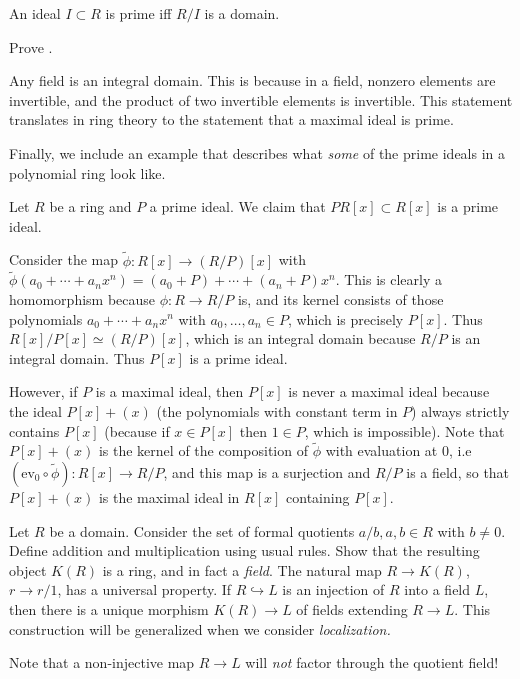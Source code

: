 \begin{proposition} \label{primeifdomain} 
An ideal $I \subset R$ is prime iff $R/I$ is a domain.
\end{proposition} 

\begin{exercise} 
Prove .
\end{exercise} 

Any field is an integral domain. This is because in a field, nonzero elements
are invertible, and the product of two invertible elements is invertible. This
statement translates in ring theory to the statement that a maximal ideal is
prime.


Finally, we include an example that describes what \emph{some} of the prime
ideals in a polynomial ring look like.
\begin{example} 
Let $R$ be a ring and $P$ a prime ideal. We claim that $PR[x] \subset R[x]$ is a
prime ideal.

Consider the map $\tilde{\phi}:R[x]\rightarrow(R/P)[x]$ with
$\tilde{\phi}(a_0+\cdots+a_nx^n)=(a_0+P)+\cdots+(a_n+P)x^n$. This is clearly
a homomorphism because $\phi:R\rightarrow R/P$ is, and its kernel consists
of those polynomials $a_0+\cdots+a_nx^n$ with $a_0,\ldots,a_n\in P$, which is
precisely $P[x]$. Thus $R[x]/P[x]\simeq (R/P)[x]$, which is an integral domain
because $R/P$ is an integral domain. Thus $P[x]$ is a prime ideal. 

However, if
$P$ is a maximal ideal, then $P[x]$ is never a maximal ideal because the ideal
$P[x]+(x)$ (the polynomials with constant term in $P$) always strictly contains
$P[x]$ (because if $x\in P[x]$ then $1\in P$, which is impossible). Note
that $P[x]+(x)$ is the kernel of the composition of $\tilde{\phi}$ with
evaluation at 0, i.e $(\text{ev}_0\circ\tilde{\phi}):R[x]\rightarrow R/P$,
and this map is a surjection and $R/P$ is a field, so that $P[x]+(x)$ is
the maximal ideal in $R[x]$ containing $P[x]$.
\end{example} 


\begin{exercise} 
Let $R$ be a domain. Consider the set of formal quotients $a/b, a, b \in R$
with $b \neq 0$. Define addition and multiplication using usual rules. Show
that the resulting object $K(R)$ is a ring, and in fact a \emph{field}. The
natural map $R \to K(R)$, $r \to r/1$, has a universal property. If $R
\hookrightarrow L$ is an injection of $R$ into a field $L$, then there is a
unique morphism $K(R) \to L$ of fields extending $R \to L$. This construction
will be generalized when we consider \emph{localization.}

Note that a non-injective map $R\to L$ will \emph{not} factor through the
quotient field!
\end{exercise} 


